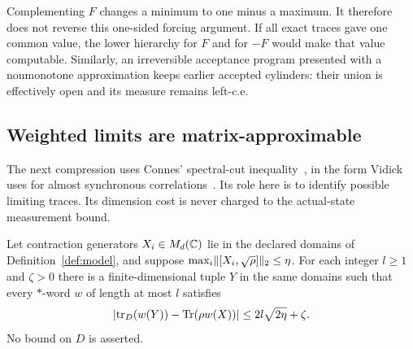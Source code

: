 Complementing $F$ changes a minimum to one minus a maximum. It therefore does not reverse this one-sided forcing argument. If all exact traces gave one common value, the lower hierarchy for $F$ and for $-F$ would make that value computable. Similarly, an irreversible acceptance program presented with a nonmonotone approximation keeps earlier accepted cylinders: their union is effectively open and its measure remains left-c.e.

\subsection{Weighted limits are matrix-approximable}
The next compression uses Connes' spectral-cut inequality~\cite{Con76}, in the form Vidick uses for almost synchronous correlations~\cite{Vid22}. Its role here is to identify possible limiting traces. Its dimension cost is never charged to the actual-state measurement bound.
\begin{lemma}\label{lem:compression}
Let contraction generators $X_i\in M_d(\mathbb C)$ lie in the declared domains of Definition~\ref{def:model}, and suppose $\max_i\lVert[X_i,\sqrt\rho]\rVert_2\le\eta$. For each integer $l\ge1$ and $\zeta>0$ there is a finite-dimensional tuple $Y$ in the same domains such that every $*$-word $w$ of length at most $l$ satisfies
\begin{equation}\label{eq:compression}
 \left|\operatorname{tr}_D(w(Y))-\operatorname{Tr}(\rho w(X))\right|
 \le2l\sqrt{2\eta}+\zeta.
\end{equation}
No bound on $D$ is asserted.
\end{lemma}
